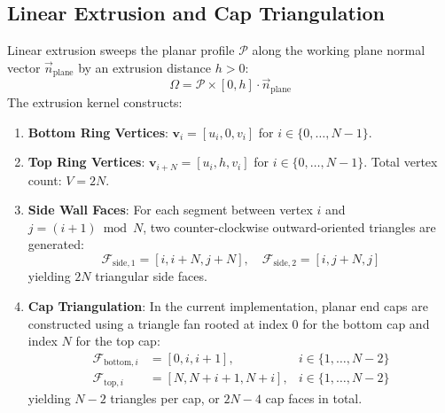 \subsection{Linear Extrusion and Cap Triangulation}
Linear extrusion sweeps the planar profile $\mathcal{P}$ along the working plane normal vector $\vec{n}_{\text{plane}}$ by an extrusion distance $h > 0$:
\begin{equation}
\Omega = \mathcal{P} \times [0, h] \cdot \vec{n}_{\text{plane}}
\label{eq:extrusion_sweep}
\end{equation}
The extrusion kernel constructs:
\begin{enumerate}
    \item \textbf{Bottom Ring Vertices}: $\mathbf{v}_i = [u_i, 0, v_i]$ for $i \in \{0, \dots, N-1\}$.
    \item \textbf{Top Ring Vertices}: $\mathbf{v}_{i+N} = [u_i, h, v_i]$ for $i \in \{0, \dots, N-1\}$. Total vertex count: $V = 2N$.
    \item \textbf{Side Wall Faces}: For each segment between vertex $i$ and $j = (i+1) \bmod N$, two counter-clockwise outward-oriented triangles are generated:
    \begin{equation}
    \mathcal{F}_{\text{side}, 1} = [i, i+N, j+N], \quad \mathcal{F}_{\text{side}, 2} = [i, j+N, j]
    \label{eq:side_quads}
    \end{equation}
    yielding $2N$ triangular side faces.
    \item \textbf{Cap Triangulation}: In the current implementation, planar end caps are constructed using a triangle fan rooted at index 0 for the bottom cap and index $N$ for the top cap:
    \begin{align}
    \mathcal{F}_{\text{bottom}, i} &= [0, i, i+1], & i \in \{1, \dots, N-2\} \label{eq:bottom_cap} \\
    \mathcal{F}_{\text{top}, i} &= [N, N+i+1, N+i], & i \in \{1, \dots, N-2\} \label{eq:top_cap}
    \end{align}
    yielding $N-2$ triangles per cap, or $2N - 4$ cap faces in total.
\end{enumerate}

